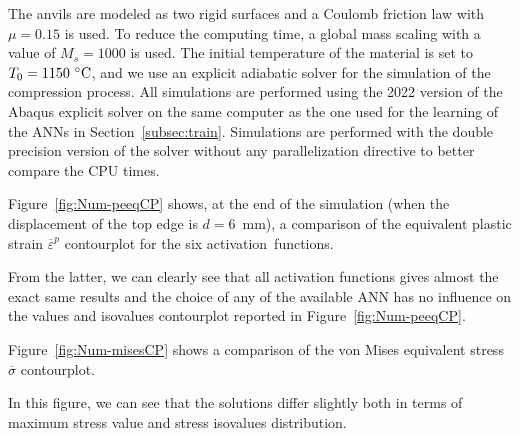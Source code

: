\documentclass[algorithms,article,accept,pdftex,oneauthor]{Definitions/mdpi}
\DeclareRobustCommand{\mdot}[1]{\accentset{\mbox{\bfseries .}}{#1}}
\DeclareRobustCommand{\ps}{\text{s}^{-1}}
\DeclareRobustCommand{\GPa}{\text{GPa}}
\begin{document}
The anvils are modeled as two rigid surfaces and a Coulomb friction law with $\mu=0.15$ is used.
To reduce the computing time, a global mass scaling with a value of $M_s=1000$ is used.
The initial temperature of the material is set to $T_{0}=1150~\celsius$, and we use an explicit adiabatic solver for the simulation of the compression process.
All simulations are performed using the 2022 version of the Abaqus explicit solver on the same computer as the one used for the learning of the ANNs in Section~\ref{subsec:train}.
Simulations are performed with the double precision version of the solver without any parallelization directive to better compare the CPU times.

Figure~\ref{fig:Num-peeqCP} shows, at the end of the simulation (when the displacement of the top edge is $d=6$~mm), a comparison of the equivalent plastic strain $\overline{\varepsilon}^p$ contourplot for the six activation~functions.

From the latter, we can clearly see that all activation functions gives almost the exact same results and the choice of any of the available ANN has no influence on the values and isovalues contourplot reported in Figure~\ref{fig:Num-peeqCP}.

Figure~\ref{fig:Num-misesCP} shows a comparison of the von Mises equivalent stress $\overline{\sigma}$ contourplot.

In this figure, we can see that the solutions differ slightly both in terms of maximum stress value and stress isovalues distribution.
\end{document}
